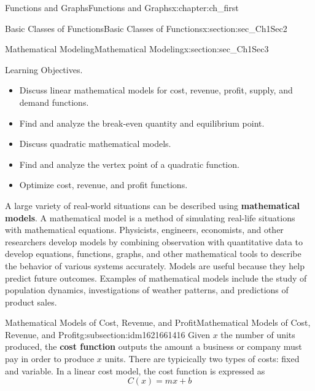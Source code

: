 \documentclass[oneside,10pt,]{book}
\newcommand{\terminology}[1]{\textbf{#1}}
\numberwithin{equation}{section}
\begin{document}
\begin{chapterptx}{Functions and Graphs}{}{Functions and Graphs}{}{}{x:chapter:ch_first}
\begin{sectionptx}{Basic Classes of Functions}{}{Basic Classes of Functions}{}{}{x:section:sec_Ch1Sec2}
\end{sectionptx}
%
%
\typeout{************************************************}
\typeout{************************************************}
%
\begin{sectionptx}{Mathematical Modeling}{}{Mathematical Modeling}{}{}{x:section:sec_Ch1Sec3}
\begin{introduction}{Learning Objectives.}%
%
\begin{itemize}[label=\textbullet]
\item{}Discuss linear mathematical models for cost, revenue, profit, supply, and demand functions.%
\item{}Find and analyze the break-even quantity and equilibrium point.%
\item{}Discuss quadratic mathematical models.%
\item{}Find and analyze the vertex point of a quadratic function.%
\item{}Optimize cost, revenue, and profit functions.%
\end{itemize}
A large variety of real-world situations can be described using \terminology{mathematical models}. A mathematical model is a method of simulating real-life situations with mathematical equations. Physicists, engineers, economists, and other researchers develop models by combining observation with quantitative data to develop equations, functions, graphs, and other mathematical tools to describe the behavior of various systems accurately. Models are useful because they help predict future outcomes. Examples of mathematical models include the study of population dynamics, investigations of weather patterns, and predictions of product sales.%
\end{introduction}%
%
%
\typeout{************************************************}
\typeout{************************************************}
%
\begin{subsectionptx}{Mathematical Models of Cost, Revenue, and Profit}{}{Mathematical Models of Cost, Revenue, and Profit}{}{}{g:subsection:idm1621661416}
Given \(x\) the number of units produced, the \terminology{cost function} outputs the amount a business or company must pay in order to produce \(x\) units. There are typicically two types of costs: fixed and variable. In a linear cost model, the cost function is expressed as%
%
\begin{equation*}
C(x)=mx+b
\end{equation*}

\end{subsectionptx}
\end{sectionptx}
\end{chapterptx}
\end{document}
